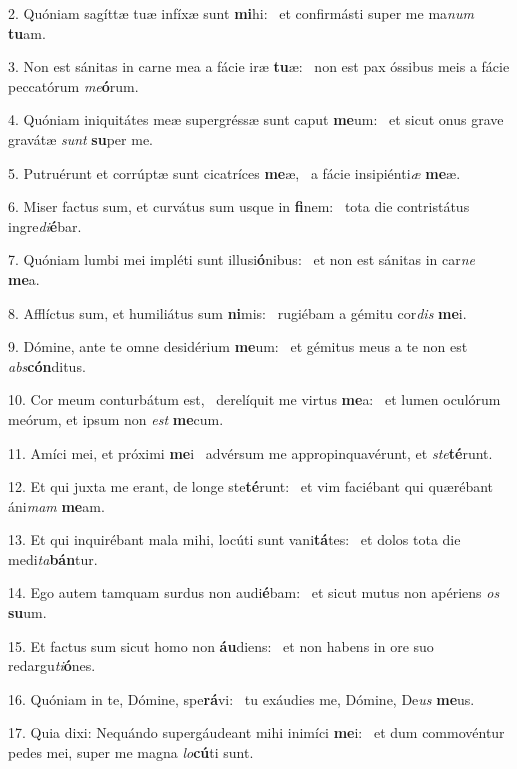 2. Quóniam sagíttæ tuæ infíxæ sunt \textbf{mi}hi: \ast\  et confirmásti super me ma\textit{num} \textbf{tu}am.\

3. Non est sánitas in carne mea a fácie iræ \textbf{tu}æ: \ast\  non est pax óssibus meis a fácie peccatórum \textit{me}\textbf{ó}rum.\

4. Quóniam iniquitátes meæ supergréssæ sunt caput \textbf{me}um: \ast\  et sicut onus grave gravátæ \textit{sunt} \textbf{su}per me.\

5. Putruérunt et corrúptæ sunt cicatríces \textbf{me}æ, \ast\  a fácie insipiénti\textit{æ} \textbf{me}æ.\

6. Miser factus sum, et curvátus sum usque in \textbf{fi}nem: \ast\  tota die contristátus ingre\textit{di}\textbf{é}bar.\

7. Quóniam lumbi mei impléti sunt illusi\textbf{ó}nibus: \ast\  et non est sánitas in car\textit{ne} \textbf{me}a.\

8. Afflíctus sum, et humiliátus sum \textbf{ni}mis: \ast\  rugiébam a gémitu cor\textit{dis} \textbf{me}i.\

9. Dómine, ante te omne desidérium \textbf{me}um: \ast\  et gémitus meus a te non est \textit{abs}\textbf{cón}ditus.\

10. Cor meum conturbátum est, \dag\  derelíquit me virtus \textbf{me}a: \ast\  et lumen oculórum meórum, et ipsum non \textit{est} \textbf{me}cum.\

11. Amíci mei, et próximi \textbf{me}i \ast\  advérsum me appropinquavérunt, et \textit{ste}\textbf{té}runt.\

12. Et qui juxta me erant, de longe ste\textbf{té}runt: \ast\  et vim faciébant qui quærébant áni\textit{mam} \textbf{me}am.\

13. Et qui inquirébant mala mihi, locúti sunt vani\textbf{tá}tes: \ast\  et dolos tota die medi\textit{ta}\textbf{bán}tur.\

14. Ego autem tamquam surdus non audi\textbf{é}bam: \ast\  et sicut mutus non apériens \textit{os} \textbf{su}um.\

15. Et factus sum sicut homo non \textbf{áu}diens: \ast\  et non habens in ore suo redargu\textit{ti}\textbf{ó}nes.\

16. Quóniam in te, Dómine, spe\textbf{rá}vi: \ast\  tu exáudies me, Dómine, De\textit{us} \textbf{me}us.\

17. Quia dixi: Nequándo supergáudeant mihi inimíci \textbf{me}i: \ast\  et dum commovéntur pedes mei, super me magna \textit{lo}\textbf{cú}ti sunt.\

